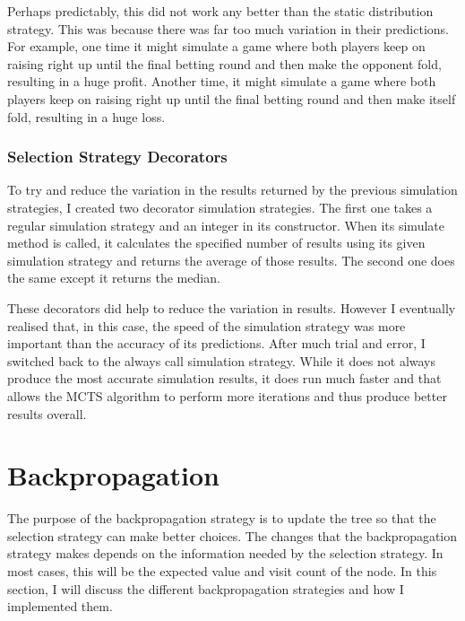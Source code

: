 Perhaps predictably, this did not work any better than the static distribution strategy. This was because there was far too much variation in their predictions. For example, one time it might simulate a game where both players keep on raising right up until the final betting round and then make the opponent fold, resulting in a huge profit. Another time, it might simulate a game where both players keep on raising right up until the final betting round and then make itself fold, resulting in a huge loss. 


\subsubsection{Selection Strategy Decorators}			%

To try and reduce the variation in the results returned by the previous simulation strategies, I created two decorator simulation strategies. The first one takes a regular simulation strategy and an integer in its constructor. When its simulate method is called, it calculates the specified number of results using its given simulation strategy and returns the average of those results. The second one does the same except it returns the median. 

These decorators did help to reduce the variation in results. However I eventually realised that, in this case, the speed of the simulation strategy was more important than the accuracy of its predictions. After much trial and error, I switched back to the always call simulation strategy. While it does not always produce the most accurate simulation results, it does run much faster and that allows the MCTS algorithm to perform more iterations and thus produce better results overall. 



\section{Backpropagation}						%



The purpose of the backpropagation strategy is to update the tree so that the selection strategy can make better choices. The changes that the backpropagation strategy makes depends on the information needed by the selection strategy. In most cases, this will be the expected value and visit count of the node. In this section, I will discuss the different backpropagation strategies and how I implemented them.

